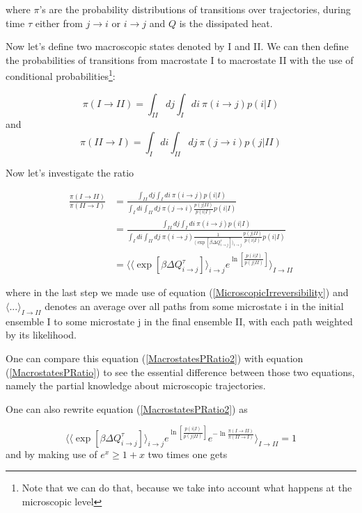 \documentclass[a4paper,12pt]{article}
\begin{document}
where $\pi$'s are the probability distributions of transitions over trajectories, during time $\tau$ either from $ j\to i$ or $ i \to j $ and $Q$ is the dissipated heat.

Now let's define two macroscopic states denoted by I and II.
We can then define the probabilities of transitions from macrostate I to macrostate II with the use of conditional probabilities\footnote{Note that we can do that, because we take into account what happens at the microscopic level}:

\begin{equation}
  \pi (I\to II)=\int_{II} d j \int_I d i\ \pi(i\to j)p(i|I)
\end{equation}
and
\begin{equation}
  \pi (II\to I)=\int_{I} d i \int_{II} d j\ \pi(j\to i)p(j|II)
\end{equation}

Now let's investigate the ratio

\begin{equation}
\begin{aligned}
\label{MacrostatesPRatio2}
  \frac{\pi(I \to II)}{\pi(II \to I)} &= \frac{\int_{II} d j \int_I d i\ \pi(i\to j)p(i|I)}{\int_{I} d i \int_{II} d j\ \pi(j\to i)\frac{p(j|II)}{p(i|I)}p(i|I)}\\
  &=\frac{\int_{II} d j \int_I d i\ \pi(i\to j) p(i|I)}{\int_{I} d i \int_{II} d j\ \pi(i\to j)\frac{1}{\langle \exp[\beta  \Delta Q_{i\to j}^{\tau}] \rangle_{i \to j} } \frac{p(j|II)}{p(i|I)}p(i|I)}\\
  &=\langle \langle \exp[\beta  \Delta Q_{i\to j}^{\tau}] \rangle_{i \to j} e^{\ln[\frac{p(i|I)}{p(j|II)}]} \rangle_{I \to II}
\end{aligned}
\end{equation}

where in the last step we made use of equation (\ref{MicroscopicIrreversibility}) and  $\langle ... \rangle_{I \to II}$ denotes an average over all paths from some microstate
i in the initial ensemble I to some microstate j in the final ensemble
II, with each path weighted by its likelihood.

One can compare this equation (\ref{MacrostatesPRatio2}) with equation (\ref{MacrostatesPRatio}) to see the essential difference between those two equations, namely the partial knowledge about microscopic trajectories.

One can also rewrite equation (\ref{MacrostatesPRatio2}) as

\begin{equation}
\langle \langle \exp[\beta  \Delta Q_{i\to j}^{\tau}] \rangle_{i \to j} e^{\ln[\frac{p(i|I)}{p(j|II)}]} e^{-\ln{\frac{\pi(I \to II)}{\pi(II \to I)}}} \rangle_{I \to II} = 1
\end{equation}
and by making use of $e^x \geq 1+x$ two times one gets
\end{document}
